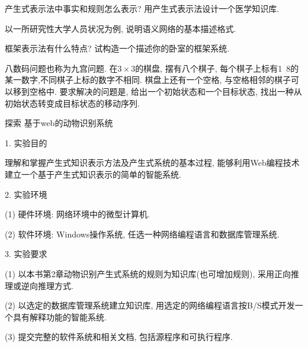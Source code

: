 \begin{think}
  产生式表示法中事实和规则怎么表示? 用产生式表示法设计一个医学知识库.
\end{think}

\begin{think}
  以一所研究性大学人员状况为例, 说明语义网络的基本描述格式.
\end{think}

\begin{think}
  框架表示法有什么特点? 试构造一个描述你的卧室的框架系统.
\end{think}

\begin{think}
  八数码问题也称为九宫问题. 在$3\times 3$的棋盘, 摆有八个棋子, 每个棋子上标有1~8的某一数字,不同棋子上标的数字不相同. 棋盘上还有一个空格, 与空格相邻的棋子可以移到空格中.
  要求解决的问题是, 给出一个初始状态和一个目标状态, 找出一种从初始状态转变成目标状态的移动序列.
\end{think}


\begin{custom}[explorecolor]{探索}
基于web的动物识别系统

    1. 实验目的

    理解和掌握产生式知识表示方法及产生式系统的基本过程, 能够利用Web编程技术建立一个基于产生式知识表示的简单的智能系统.

    2. 实验环境

    (1) 硬件环境: 网络环境中的微型计算机.

    (2) 软件环境: Windows操作系统, 任选一种网络编程语言和数据库管理系统.

    3. 实验要求

    (1) 以本书第2章动物识别产生式系统的规则为知识库(也可增加规则), 采用正向推理或逆向推理方式.

    (2) 以选定的数据库管理系统建立知识库, 用选定的网络编程语言按B/S模式开发一个具有解释功能的智能系统.

    (3) 提交完整的软件系统和相关文档, 包括源程序和可执行程序.
\end{custom}
